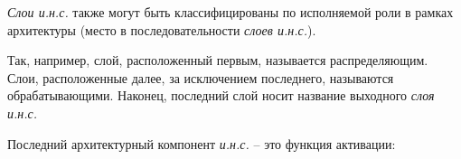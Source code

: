 \textit{Слои и.н.с.} также могут быть классифицированы по исполняемой роли в рамках архитектуры (место в последовательности \textit{слоев и.н.с.}).

Так, например, слой, расположенный первым, называется распределяющим. Слои, расположенные далее, за исключением последнего, называются обрабатывающими. Наконец, последний слой носит название выходного \textit{слоя и.н.с.}

Последний архитектурный компонент \textit{и.н.с.} -- это функция активации:

\begin{SCn}
\end{SCn}

